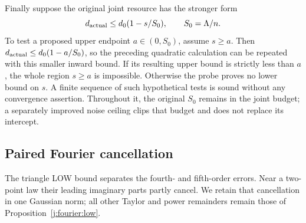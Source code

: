 Finally suppose the original joint resource has the stronger form
\[
 d_{\rm actual}\le d_0(1-s/S_0),\qquad S_0=\Lambda/n.
\]
To test a proposed upper endpoint $a\in(0,S_0)$, assume $s\ge a$.
Then $d_{\rm actual}\le d_0(1-a/S_0)$, so the preceding quadratic
calculation can be repeated with this smaller inward bound. If its
resulting upper bound is strictly less than $a$, the whole region
$s\ge a$ is impossible. Otherwise the probe proves no lower bound
on $s$. A finite sequence of such hypothetical tests is sound
without any convergence assertion. Throughout it, the original
$S_0$ remains in the joint budget; a separately improved noise
ceiling clips that budget and does not replace its intercept.


\subsection{Paired Fourier cancellation}
\label{j:local:paired}
The triangle LOW bound separates the fourth- and fifth-order errors.
Near a two-point law their leading imaginary parts partly cancel.
We retain that cancellation in one Gaussian norm; all other Taylor and
power remainders remain those of Proposition~\ref{j:fourier:low}.


